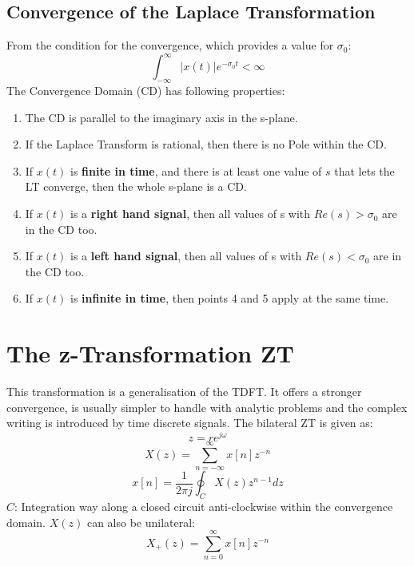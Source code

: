 \documentclass[10pt,a4paper]{article}
\begin{document}
\subsection{Convergence of the Laplace Transformation}
From the condition for the convergence, which provides a value for $\sigma_0$:
$$
\int_{-\infty}^{\infty} \vert x(t) \vert e^{-\sigma_0t} < \infty
$$
The Convergence Domain (CD) has following properties:
\begin{enumerate}
\item The CD is parallel to the imaginary axis in the s-plane.
\item If the Laplace Transform is rational, then there is no Pole within the CD.
\item If $x(t)$ is \textbf{finite in time}, and there is at least one value of $s$ that lets the LT converge, then the whole s-plane is a CD.
\item If $x(t)$ is a \textbf{right hand signal}, then all values of s with $Re(s) > \sigma_0$ are in the CD too. 
\item If $x(t)$ is a \textbf{left hand signal}, then all values of s with $Re(s) < \sigma_0$ are in the CD too. 
\item If $x(t)$ is \textbf{infinite in time}, then points 4 and 5 apply at the same time. 
\end{enumerate}

\newpage
\section{The z-Transformation ZT}
This transformation is a generalisation of the TDFT. It offers a stronger convergence, is usually simpler to handle with analytic problems and the complex writing is introduced by time discrete signals.
The bilateral ZT is given as:
$$
z = re^{j\omega}
$$
$$
\boxed{
X(z) = \sum_{n=-\infty}^{\infty} x[n] z^{-n}
}
$$
$$
\boxed{
x[n] = \frac{1}{2\pi j} \oint_C X(z)z^{n-1} dz
}
$$
$C$: Integration way along a closed circuit anti-clockwise within the convergence domain.
$X(z)$ can also be unilateral: 
$$
X_+(z) = \sum_{n=0}^{\infty} x[n] z^{-n}
$$
\end{document}
